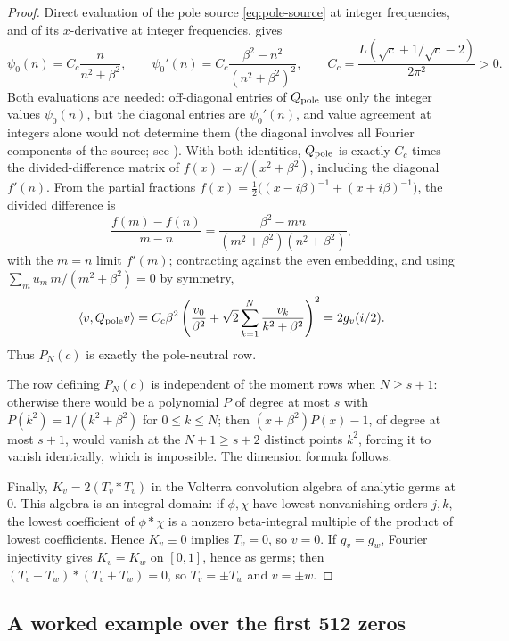 \documentclass[11pt]{article}
\theoremstyle{plain}
\theoremstyle{definition}
\theoremstyle{remark}
\begin{document}
\begin{proof}
Direct evaluation of the pole source \eqref{eq:pole-source} at integer
frequencies, and of its $x$-derivative at integer frequencies, gives
\[
        \psi_0(n)=
        C_c\frac{n}{n^2+\beta^2},
\qquad
        \psi_0'(n)=
        C_c\frac{\beta^2-n^2}{(n^2+\beta^2)^2},
\qquad
        C_c=\frac{L(\sqrt c+1/\sqrt c-2)}{2\pi^2}>0.
\]
Both evaluations are needed: off-diagonal entries of $Q_{\rm pole}$ use only
the integer values $\psi_0(n)$, but the diagonal entries are
$\psi_0'(n)$, and value agreement at integers alone would not determine them
(the diagonal involves all Fourier components of the source; see
\cite[Sec.~4.2]{ConnesvanSuijlekom2025}).  With both identities,
$Q_{\rm pole}$ is exactly $C_c$ times the divided-difference matrix of
$f(x)=x/(x^2+\beta^2)$, including the diagonal $f'(n)$.  From the partial
fractions $f(x)=\tfrac12\bigl((x-i\beta)^{-1}+(x+i\beta)^{-1}\bigr)$, the
divided difference is
\[
 \frac{f(m)-f(n)}{m-n}
 =\frac{\beta^2-mn}{(m^2+\beta^2)(n^2+\beta^2)},
\]
with the $m=n$ limit $f'(m)$; contracting against the even embedding, and
using $\sum_m u_m\,m/(m^2+\beta^2)=0$ by symmetry,
\[
\langle v,Q_{\rm pole}v\rangle
 =
 C_c\beta^2
 \left(
 \frac{v_0}{\beta^2}
 +\sqrt2\sum_{k=1}^N\frac{v_k}{k^2+\beta^2}
 \right)^2
 =
 2g_v(i/2).
\]
Thus $P_N(c)$ is exactly the pole-neutral row.

The row defining $P_N(c)$ is independent of the moment rows when $N\ge s+1$:
otherwise there would be a polynomial $P$ of degree at most $s$ with
$P(k^2)=1/(k^2+\beta^2)$ for $0\le k\le N$; then
$(x+\beta^2)P(x)-1$, of degree at most $s+1$, would vanish at the $N+1\ge s+2$
distinct points $k^2$, forcing it to vanish identically, which is impossible.
The dimension formula follows.

Finally, $K_v=2(T_v*T_v)$ in the Volterra convolution algebra of analytic
germs at $0$.  This algebra is an integral domain: if $\phi,\chi$ have lowest
nonvanishing orders $j,k$, the lowest coefficient of $\phi*\chi$ is a nonzero
beta-integral multiple of the product of lowest coefficients.  Hence
$K_v\equiv0$ implies $T_v=0$, so $v=0$.  If $g_v=g_w$, Fourier injectivity
gives $K_v=K_w$ on $[0,1]$, hence as germs; then
$(T_v-T_w)*(T_v+T_w)=0$, so $T_v=\pm T_w$ and $v=\pm w$.
\end{proof}

\subsection{A worked example over the first 512 zeros}\label{sec:example}
\end{document}
